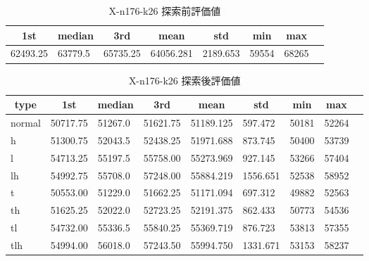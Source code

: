 \begin{table}[htbp]
    \caption{X-n176-k26 探索前評価値}
    \begin{tabular}{|l|l|l|l|l|l|l|l|}\hline
    \multicolumn{1}{|c|}{\textbf{1st}}
    &\multicolumn{1}{c|}{\textbf{median}}
    &\multicolumn{1}{c|}{\textbf{3rd}}
    &\multicolumn{1}{c|}{\textbf{mean}}
    &\multicolumn{1}{c|}{\textbf{std}}
    &\multicolumn{1}{c|}{\textbf{min}}
    &\multicolumn{1}{c|}{\textbf{max}}\\\hline
	62493.25 & 63779.5 & 65735.25 & 64056.281 & 2189.653 & 59554 & 68265\\\hline
	\end{tabular}
\end{table}
\begin{table}[htbp]
    \caption{X-n176-k26 探索後評価値}
    \begin{tabular}{|l|l|l|l|l|l|l|l|l|}\hline
    \multicolumn{1}{|c|}{\textbf{type}}
    &\multicolumn{1}{|c|}{\textbf{1st}}
    &\multicolumn{1}{c|}{\textbf{median}}
    &\multicolumn{1}{c|}{\textbf{3rd}}
    &\multicolumn{1}{c|}{\textbf{mean}}
    &\multicolumn{1}{c|}{\textbf{std}}
    &\multicolumn{1}{c|}{\textbf{min}}
    &\multicolumn{1}{c|}{\textbf{max}}\\\hline
	normal & 50717.75 & 51267.0 & 51621.75 & 51189.125 & 597.472 & 50181 & 52264\\\hline
	h & 51300.75 & 52043.5 & 52438.25 & 51971.688 & 873.745 & 50400 & 53739\\\hline
	l & 54713.25 & 55197.5 & 55758.00 & 55273.969 & 927.145 & 53266 & 57404\\\hline
	lh & 54992.75 & 55708.0 & 57248.00 & 55884.219 & 1556.651 & 52538 & 58952\\\hline
	t & 50553.00 & 51229.0 & 51662.25 & 51171.094 & 697.312 & 49882 & 52563\\\hline
	th & 51625.25 & 52022.0 & 52723.25 & 52191.375 & 862.433 & 50773 & 54536\\\hline
	tl & 54732.00 & 55336.5 & 55840.25 & 55369.719 & 876.723 & 53813 & 57355\\\hline
	tlh & 54994.00 & 56018.0 & 57243.50 & 55994.750 & 1331.671 & 53153 & 58237\\\hline
	\end{tabular}
\end{table}
